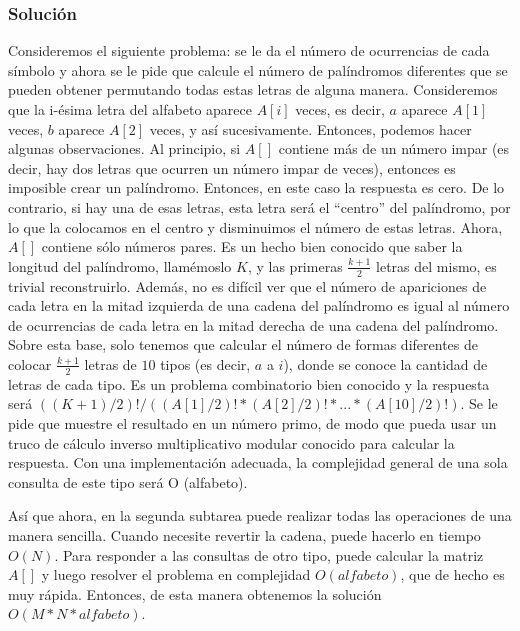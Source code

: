 \documentclass[12pt]{article}
\newcommand{\nl}{\vspace{0.3cm}}
\begin{document}
\subsubsection{Solución}

Consideremos el siguiente problema: se le da el número de ocurrencias de cada símbolo y ahora se le pide que calcule el número de palíndromos diferentes que se pueden obtener permutando todas estas letras de alguna manera. Consideremos que la i-ésima letra del alfabeto aparece $A[i]$ veces, es decir, $a$ aparece $A[1]$ veces, $b$ aparece $A[2]$ veces, y así sucesivamente. Entonces, podemos hacer algunas observaciones. Al principio, si $A[]$ contiene más de un número impar (es decir, hay dos letras que ocurren un número impar de veces), entonces es imposible crear un palíndromo. Entonces, en este caso la respuesta es cero. De lo contrario, si hay una de esas letras, esta letra será el “centro” del palíndromo, por lo que la colocamos en el centro y disminuimos el número de estas letras. Ahora, $A[]$ contiene sólo números pares. Es un hecho bien conocido que saber la longitud del palíndromo, llamémoslo $K$, y las primeras $\frac{k + 1}{2}$ letras del mismo, es trivial reconstruirlo. Además, no es difícil ver que el número de apariciones de cada letra en la mitad izquierda de una cadena del palíndromo es igual al número de ocurrencias de cada letra en la mitad derecha de una cadena del palíndromo. Sobre esta base, solo tenemos que calcular el número de formas diferentes de colocar $\frac{k + 1}{2}$ letras de $10$ tipos (es decir, $a$ a $i$), donde se conoce la cantidad de letras de cada tipo. Es un problema combinatorio bien conocido y la respuesta será $((K + 1) / 2)! / ((A [1] / 2)! * (A [2] / 2)! * ... * (A [ 10] / 2)!)$. Se le pide que muestre el resultado en un número primo, de modo que pueda usar un truco de cálculo inverso multiplicativo modular conocido para calcular la respuesta. Con una implementación adecuada, la complejidad general de una sola consulta de este tipo será O (alfabeto).

\nl

Así que ahora, en la segunda subtarea puede realizar todas las operaciones de una manera sencilla. Cuando necesite revertir la cadena, puede hacerlo en tiempo $O(N)$. Para responder a las consultas de otro tipo, puede calcular la matriz $A[]$ y luego resolver el problema en complejidad $O(alfabeto)$, que de hecho es muy rápida. Entonces, de esta manera obtenemos la solución $O(M * N * alfabeto)$.

\nl
\end{document}
